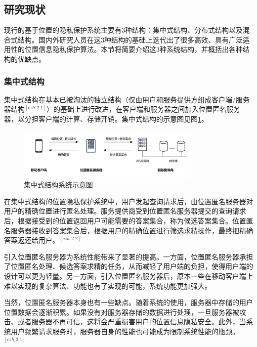 \documentclass[zihao=-4]{ctexart}
\begin{document}
\subsection{研究现状}


现行的基于位置的隐私保护系统主要有3种结构：集中式结构、分布式结构以及混合式结构。国内外研究人员在这3种结构的基础上迭代出了很多高效、具有广泛适用性的位置信息隐私保护算法。本节将简要介绍这3种系统结构，并概括出各种结构的优缺点。

\subsubsection{集中式结构}
集中式结构在基本已被淘汰的独立结构（仅由用户和服务提供方组成客户端/服务器结构$^{[czh\_2.1]}$）的基础上进行改进，在客户端和服务器之间加入位置匿名服务器，以分担客户端的计算、存储开销。集中式结构的示意图见图\ref{集中式结构}。

\begin{figure}[H] %
	\centering %
	\includegraphics[width=0.8\textwidth]{./include_picture/集中式结构（绪论-研究现状）} %
	\caption{集中式结构系统示意图} %
	\label{集中式结构} %
\end{figure}

在集中式结构的位置隐私保护系统中，用户发起查询请求后，由位置匿名服务器对用户的精确位置进行匿名处理。服务提供商受到位置匿名服务器提交的查询请求后，根据接受到的位置返回用户可能需要的答案集合，称为候选答案集合。位置匿名服务器接收到答案集合后，根据用户的精确位置进行筛选求精操作，最终把精确答案返还给用户。$^{[czh\_2.2]}$
\par
引入位置匿名服务器为系统性能带来了显著的提高。一方面，位置匿名服务器承担了位置匿名处理、候选答案求精的任务，从而减轻了用户端的负担，使得用户端的设计可以更为轻量。另一方面，引入位置匿名服务器后，原本一些在移动客户端上难以实现的复杂算法、功能也有了实现的可能，系统功能更加强大。
\par
当然，位置匿名服务器本身也有一些缺点。随着系统的使用，服务器中存储的用户位置数据会逐渐积累。如果没有对服务器存储的数据进行处理，一旦服务器被攻击、或者服务器不再可信，这将会严重损害用户的位置信息隐私安全。此外，当系统用户频繁请求服务时，服务器自身的性能也可能成为限制系统性能的瓶颈。$^{[czh\_2.1]}$
\end{document}
